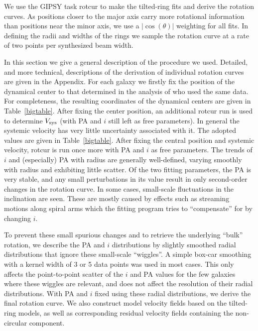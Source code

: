 \documentclass[usenatbib,usegraphicx,apjfonts,floatfix]{emulateapj}
\begin{document}
We use the GIPSY task {\sc rotcur} to make the tilted-ring fits and
derive the rotation curves. As positions closer to the major axis
carry more rotational information than positions near the minor axis,
we use a $|\cos(\theta)|$ weighting for all fits.  In defining the
radii and widths of the rings we sample the rotation curve at a rate
of two points per synthesized beam width.

In this section we give a general description of the procedure we
used.  Detailed, and more technical, descriptions of the derivation of
individual rotation curves  are given in the Appendix.
For each galaxy we firstly fix the position of the dynamical center to
that determined in the analysis of \citet{clemens2007} who used the
same data.  For completeness, the resulting coordinates of the
dynamical centers are given in Table~\ref{bigtable}.  After fixing the
center position, an additional {\sc rotcur} run is used to determine
$V_{\rm sys}$ (with PA and $i$ still left as free parameters). In
general the systemic velocity has very little uncertainty associated
with it.  The adopted values are given in Table~\ref{bigtable}.  After
fixing the central position and systemic velocity, {\sc rotcur} is run
once more with PA and $i$ as free parameters.  The trends of $i$ and
(especially) PA with radius are generally well-defined, varying
smoothly with radius and exhibiting little scatter.  Of the two
fitting parameters, the PA is very stable, and any small perturbations
in its value result in only second-order changes in the rotation
curve.  In some cases, small-scale fluctuations in the inclination are
seen. These are mostly caused by effects such as streaming motions
along spiral arms which the fitting program tries to ``compensate''
for by changing $i$.

To prevent these small spurious changes and to retrieve the underlying
``bulk'' rotation, we describe the PA and $i$ distributions by
slightly smoothed radial distributions that ignore these small-scale
``wiggles''. A simple box-car smoothing with a kernel width of 3 or 5
data points was used in most cases.  This only affects the
point-to-point scatter of the $i$ and PA values for the few galaxies
where these wiggles are relevant, and does not affect the resolution
of their radial distributions. With PA and $i$ fixed using these
radial distributions, we derive the final rotation curve. We also
construct model velocity fields based on the tilted-ring models, as
well as corresponding residual velocity fields containing the
non-circular component.
\end{document}
